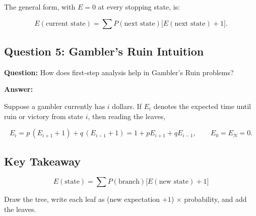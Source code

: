 \documentclass{article}
\begin{document}
The general form, with $E=0$ at every stopping state, is:

\[
E(\text{current state}) = \sum P(\text{next state})\bigl[E(\text{next state})+1\bigr].
\]

\subsection*{Question 5: Gambler's Ruin Intuition}

\textbf{Question:}
How does first-step analysis help in Gambler's Ruin problems?

\begin{center}
\end{center}

\textbf{Answer:}

Suppose a gambler currently has $i$ dollars. If $E_i$ denotes the expected time until ruin or victory from state $i$, then reading the leaves,

\[
E_i=p\,(E_{i+1}+1)+q\,(E_{i-1}+1)=1+pE_{i+1}+qE_{i-1},
\qquad E_0=E_N=0.
\]

\subsection*{Key Takeaway}

\[
\boxed{
E(\text{state})
=
\sum P(\text{branch})\bigl[E(\text{new state})+1\bigr]
}
\]

Draw the tree, write each leaf as (new expectation $+1$) $\times$ probability, and add the leaves.
\end{document}
